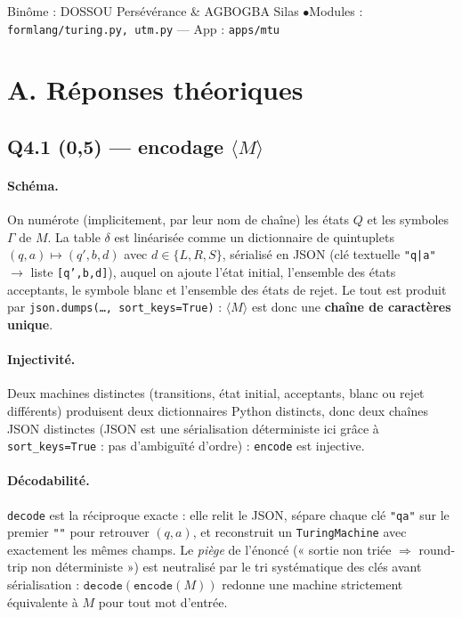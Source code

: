 \documentclass[11pt,a4paper]{scrartcl}
\begin{document}
{Binôme : DOSSOU Persévérance \& AGBOGBA Silas \quad$\bullet$\quad Modules : \texttt{formlang/turing.py, utm.py} — App : \texttt{apps/mtu}}

\section*{A. Réponses théoriques}

\subsection*{Q4.1 (0,5) — encodage $\langle M\rangle$}

\paragraph{Schéma.} On numérote (implicitement, par leur nom de chaîne) les états
$Q$ et les symboles $\Gamma$ de $M$. La table $\delta$ est linéarisée comme un
dictionnaire de quintuplets $(q,a)\mapsto(q',b,d)$ avec $d\in\{L,R,S\}$, sérialisé
en JSON (clé textuelle \texttt{"q|a"} $\to$ liste \texttt{[q',b,d]}), auquel on
ajoute l'état initial, l'ensemble des états acceptants, le symbole blanc et
l'ensemble des états de rejet. Le tout est produit par
\texttt{json.dumps(\dots, sort\_keys=True)} : $\langle M\rangle$ est donc une
\textbf{chaîne de caractères unique}.

\paragraph{Injectivité.} Deux machines distinctes (transitions, état initial,
acceptants, blanc ou rejet différents) produisent deux dictionnaires Python
distincts, donc deux chaînes JSON distinctes (JSON est une sérialisation
déterministe ici grâce à \texttt{sort\_keys=True} : pas d'ambiguïté d'ordre) :
\texttt{encode} est injective.

\paragraph{Décodabilité.} \texttt{decode} est la réciproque exacte : elle relit le
JSON, sépare chaque clé \texttt{"q\textbar a"} sur le premier \texttt{"\textbar"}
pour retrouver $(q,a)$, et reconstruit un \texttt{TuringMachine} avec exactement
les mêmes champs. Le \emph{piège} de l'énoncé (« sortie non triée $\Rightarrow$
round-trip non déterministe ») est neutralisé par le tri systématique des clés
avant sérialisation : $\texttt{decode}(\texttt{encode}(M))$ redonne une machine
strictement équivalente à $M$ pour tout mot d'entrée.
\end{document}
